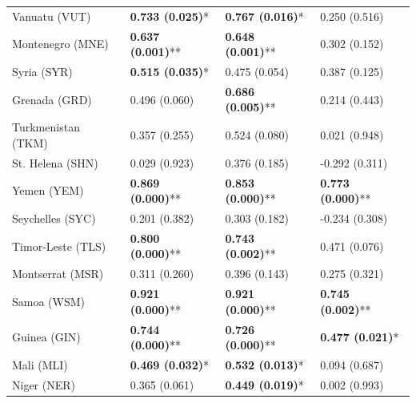 \begin{longtable}{p{5cm}p{3cm}p{3cm}p{5cm}}
Vanuatu (VUT) & \textcolor{atlLime600}{\textbf{0.733 (0.025)}*} & \textcolor{atlLime600}{\textbf{0.767 (0.016)}*} & \textcolor{atlOrange600}{0.250 (0.516)} \\
Montenegro (MNE) & \textcolor{atlLime600}{\textbf{0.637 (0.001)}**} & \textcolor{atlLime600}{\textbf{0.648 (0.001)}**} & \textcolor{atlOrange600}{0.302 (0.152)} \\
Syria (SYR) & \textcolor{atlLime600}{\textbf{0.515 (0.035)}*} & \textcolor{atlOrange600}{0.475 (0.054)} & \textcolor{atlOrange600}{0.387 (0.125)} \\
Grenada (GRD) & \textcolor{atlOrange600}{0.496 (0.060)} & \textcolor{atlLime600}{\textbf{0.686 (0.005)}**} & \textcolor{atlOrange600}{0.214 (0.443)} \\
Turkmenistan (TKM) & \textcolor{atlOrange600}{0.357 (0.255)} & \textcolor{atlOrange600}{0.524 (0.080)} & \textcolor{atlOrange600}{0.021 (0.948)} \\
St. Helena (SHN) & \textcolor{atlOrange600}{0.029 (0.923)} & \textcolor{atlOrange600}{0.376 (0.185)} & \textcolor{atlOrange600}{-0.292 (0.311)} \\
Yemen (YEM) & \textcolor{atlLime600}{\textbf{0.869 (0.000)}**} & \textcolor{atlLime600}{\textbf{0.853 (0.000)}**} & \textcolor{atlLime600}{\textbf{0.773 (0.000)}**} \\
Seychelles (SYC) & \textcolor{atlOrange600}{0.201 (0.382)} & \textcolor{atlOrange600}{0.303 (0.182)} & \textcolor{atlOrange600}{-0.234 (0.308)} \\
Timor-Leste (TLS) & \textcolor{atlLime600}{\textbf{0.800 (0.000)}**} & \textcolor{atlLime600}{\textbf{0.743 (0.002)}**} & \textcolor{atlOrange600}{0.471 (0.076)} \\
Montserrat (MSR) & \textcolor{atlOrange600}{0.311 (0.260)} & \textcolor{atlOrange600}{0.396 (0.143)} & \textcolor{atlOrange600}{0.275 (0.321)} \\
Samoa (WSM) & \textcolor{atlLime600}{\textbf{0.921 (0.000)}**} & \textcolor{atlLime600}{\textbf{0.921 (0.000)}**} & \textcolor{atlLime600}{\textbf{0.745 (0.002)}**} \\
Guinea (GIN) & \textcolor{atlLime600}{\textbf{0.744 (0.000)}**} & \textcolor{atlLime600}{\textbf{0.726 (0.000)}**} & \textcolor{atlLime600}{\textbf{0.477 (0.021)}*} \\
Mali (MLI) & \textcolor{atlLime600}{\textbf{0.469 (0.032)}*} & \textcolor{atlLime600}{\textbf{0.532 (0.013)}*} & \textcolor{atlOrange600}{0.094 (0.687)} \\
Niger (NER) & \textcolor{atlOrange600}{0.365 (0.061)} & \textcolor{atlLime600}{\textbf{0.449 (0.019)}*} & \textcolor{atlOrange600}{0.002 (0.993)} \\

\end{longtable}
